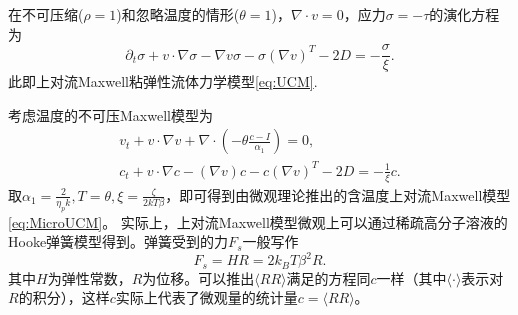 	在不可压缩($\rho=1$)和忽略温度的情形($\theta=1$)，$\nabla \cdot v = 0$，应力$\sigma = -\tau$的演化方程为
	\begin{equation*}
		\partial_t \sigma + v \cdot \nabla \sigma - \nabla v \sigma - \sigma (\nabla v)^T - 2 D = -\frac{\sigma}{\xi}. 
	\end{equation*}
	此即上对流Maxwell粘弹性流体力学模型\eqref{eq:UCM}.	

	考虑温度的不可压Maxwell模型为
	\begin{eqnarray*}%
		v_t + v \cdot \nabla v + \nabla \cdot (-\theta \frac{c-I}{\alpha_1}) = 0, \\
		c_t + v \cdot \nabla c - (\nabla v) c - c (\nabla v)^T - 2 D = -\frac{1}{\xi} c.
	\end{eqnarray*}
	取$\alpha_1 = \frac{2}{\eta_p k}, T = \theta,\xi = \frac{\zeta}{2 kT \beta}$，即可得到由微观理论推出的含温度上对流Maxwell模型\eqref{eq:MicroUCM}。	实际上，上对流Maxwell模型微观上可以通过稀疏高分子溶液的Hooke弹簧模型得到\cite{larson1999structure,le2009multiscale}。弹簧受到的力$F_s$一般写作
	\begin{equation*}
		F_s = H R = 2 k_B T \beta^2 R.
	\end{equation*}
	其中$H$为弹性常数，$R$为位移。可以推出$\langle RR \rangle$满足的方程同$c$一样（其中$\langle \cdot \rangle$表示对$R$的积分）\cite{larson1999structure}，这样$c$实际上代表了微观量的统计量$c = \langle RR \rangle$。

